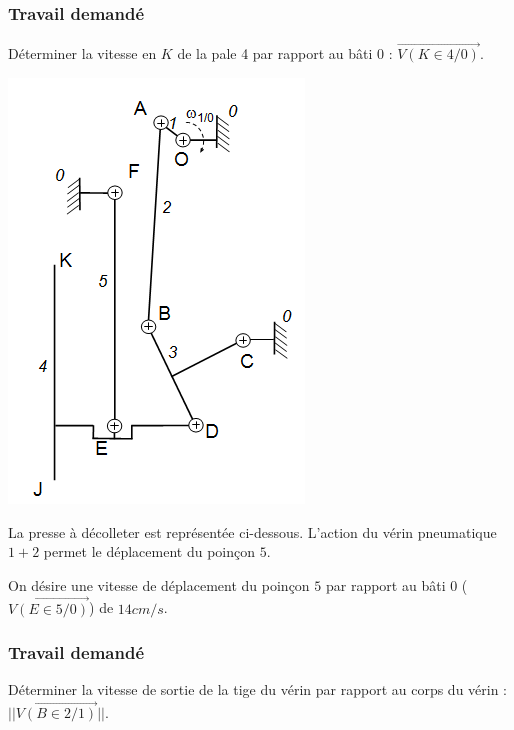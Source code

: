 \subsubsection{Travail demandé}
Déterminer la vitesse en $K$ de la pale 4 par rapport au bâti 0 : $\overrightarrow{V(K \in 4/0)}$.
\newpage
$$
\quad
$$

\begin{center}
\includegraphics[width=.7\textwidth]{png/fig2-batteurhoule}
\end{center}
\newpage

La presse à décolleter est représentée ci-dessous. L’action du vérin pneumatique $1+2$ permet le déplacement du poinçon $5$.

On désire une vitesse de déplacement du poinçon $5$ par rapport au bâti $0$ ($\overrightarrow{V(E \in 5/0)}$) de $14 cm/s$.

\subsubsection{Travail demandé}
Déterminer la vitesse de sortie de la tige du vérin par rapport au corps du vérin : $||\overrightarrow{V(B \in 2/1)}||$.


